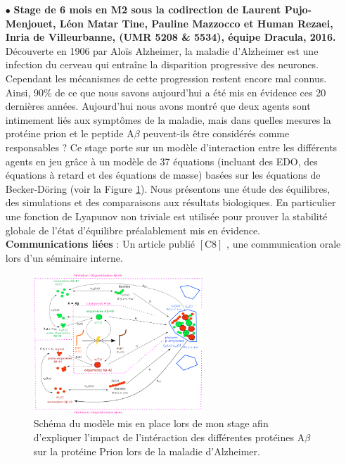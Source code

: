 \documentclass[a4paper, 12pt, twoside, openright]{article}
\begin{document}
\begin{itemize}
\item[\color{MagSombre}$\bullet$] \textbf{\color{MagSombre}Stage de 6 mois en M2 sous la codirection de Laurent Pujo-Menjouet, Léon Matar Tine, Pauline Mazzocco et Human Rezaei, Inria de Villeurbanne, (UMR 5208 \& 5534), équipe Dracula, 2016.} Découverte en 1906 par Aloïs Alzheimer, la maladie d'Alzheimer est une infection du cerveau qui entraîne la disparition progressive des neurones. Cependant les mécanismes de cette progression restent encore mal connus. Ainsi, 90\% de ce que nous savons aujourd'hui a été mis en évidence ces 20 dernières années. Aujourd'hui nous avons montré que deux agents sont intimement liés aux symptômes de la maladie, mais dans quelles mesures la protéine prion et le peptide A$\beta$ peuvent-ils être considérés comme responsables \cite{resenberger2011,gimbel2010} ? Ce stage porte sur un modèle d'interaction entre les différents agents en jeu grâce à un modèle de 37 équations (incluant des EDO, des équations à retard et des équations de masse) basées sur les équations de Becker-Döring (voir la Figure \ref{stage}). Nous présentons une étude des équilibres, des simulations et des comparaisons aux résultats biologiques. En particulier une fonction de Lyapunov non triviale est utilisée pour prouver la stabilité globale de l'état d'équilibre préalablement mis en évidence.\\
\textbf{Communications liées }: Un article publié $\left[ \text{C8} \right]$ , une communication orale lors d'un séminaire interne.
 \begin{figure}[!htbp]
\centering
\includegraphics[width=0.6\textwidth]{schem.png}
\caption{Schéma du modèle mis en place lors de mon stage afin d'expliquer l'impact de l'intéraction des différentes protéines A$\beta$ sur la protéine Prion lors de la maladie d'Alzheimer.}\label{stage}
\end{figure}

\end{itemize}
\end{document}
